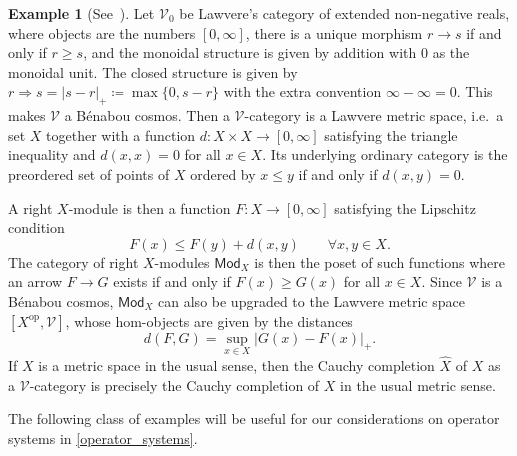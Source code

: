 \documentclass[11pt,onecolumn]{article}
\newcommand{\cV}{\mathscr{V}}
\newcommand{\op}{\mathrm{op}}
\newcommand{\Mod}{\mathsf{Mod}}
\theoremstyle{plain}
\theoremstyle{remark}
\theoremstyle{definition}
\newtheorem{example}[example]{Example}
\begin{document}
\begin{example}[See~\cite{Lawvere}]
	Let $\cV_0$ be Lawvere's category of extended non-negative reals, where objects are the numbers $[0, \infty]$, there is a unique morphism $r \to s$ if and only if $r \geq s$, and the monoidal structure is given by addition with $0$ as the monoidal unit.
	The closed structure is given by $r \Rightarrow s = |s - r|_+ \coloneqq \max\{0, s - r\}$ with the extra convention $\infty - \infty = 0$.
	This makes $\cV$ a B\'enabou cosmos.
	Then a $\cV$-category is a Lawvere metric space, i.e.~a set $X$ together with a function $d : X \times X \to [0, \infty]$
	satisfying the triangle inequality and $d(x, x) = 0$ for all $x \in X$.
	Its underlying ordinary category is the preordered set of points of $X$ ordered by $x \leq y$ if and only if $d(x, y) = 0$.

	A right $X$-module is then a function $F : X \to [0, \infty]$ satisfying the Lipschitz condition
	\[
		F(x) \leq F(y) + d(x, y) \qquad \forall x, y \in X.
	\]
	The category of right $X$-modules $\Mod_X$ is then the poset of such functions where an arrow $F \to G$ exists if and only if $F(x) \geq G(x)$ for all $x \in X$.
	Since $\cV$ is a B\'enabou cosmos, $\Mod_X$ can also be upgraded to the Lawvere metric space $[X^\op, \cV]$,
	whose hom-objects are given by the distances
	\[
		d(F, G) = \sup_{x \in X} |G(x) - F(x)|_+.
	\]
	If $X$ is a metric space in the usual sense, then the Cauchy completion $\widehat{X}$ of $X$ as a $\cV$-category is precisely the Cauchy completion of $X$ in the usual metric sense.
\end{example}

The following class of examples will be useful for our considerations on operator systems in \cref{operator_systems}.
\end{document}
